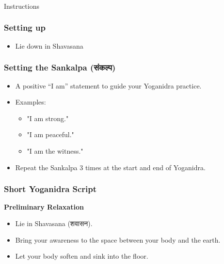 \begin{frame}[fragile]\frametitle{}
\begin{center}
{\Large Instructions}
\end{center}
\end{frame}


\begin{frame}[fragile]\frametitle{Setting up}
    \begin{itemize}
        \item Lie down in Shavasana
    \end{itemize}
\end{frame}

\begin{frame}[fragile]\frametitle{Setting the Sankalpa (संकल्प)}
    \begin{itemize}
        \item A positive “I am” statement to guide your Yoganidra practice.
        \item Examples:
        \begin{itemize}
            \item "I am strong."
            \item "I am peaceful."
            \item "I am the witness."
        \end{itemize}
        \item Repeat the Sankalpa 3 times at the start and end of Yoganidra.
    \end{itemize}
\end{frame}

\begin{frame}[fragile]\frametitle{Short Yoganidra Script}
    \textbf{Preliminary Relaxation}
    \begin{itemize}
        \item Lie in Shavasana (शवासन).
        \item Bring your awareness to the space between your body and the earth.
        \item Let your body soften and sink into the floor.
    \end{itemize}
\end{frame}

